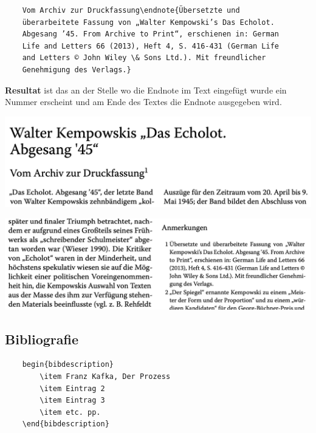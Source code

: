 \documentclass{article}
\begin{document}
\begin{lstlisting}
    Vom Archiv zur Druckfassung\endnote{Übersetzte und 
    überarbeitete Fassung von „Walter Kempowski’s Das Echolot. 
    Abgesang ’45. From Archive to Print“, erschienen in: German 
    Life and Letters 66 (2013), Heft 4, S. 416-431 (German Life 
    and Letters © John Wiley \& Sons Ltd.). Mit freundlicher 
    Genehmigung des Verlags.}
\end{lstlisting}

\textbf{Resultat} ist das an der Stelle wo die Endnote im Text eingefügt wurde ein Nummer erscheint und am Ende des Textes die Endnote ausgegeben wird.

\begin{center}
    \includegraphics[scale=0.4]{nummerierung-endnote.png}
\end{center}

\begin{center}
    \includegraphics[scale=0.4]{endnote.png}
\end{center}

\subsection{Bibliografie}

\begin{lstlisting}
    begin{bibdescription}
        \item Franz Kafka, Der Prozess
        \item Eintrag 2
        \item Eintrag 3 
        \item etc. pp.
    \end{bibdescription}
\end{lstlisting}
\end{document}
